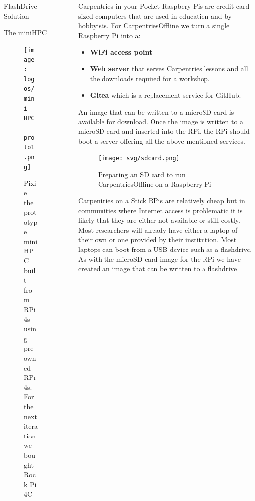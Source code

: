 \documentclass[final,20pt]{beamer}
\newlength{\sepwidth}
\newlength{\colwidth}
\newcommand{\separatorcolumn}{\begin{column}{\sepwidth}\end{column}}
\begin{document}
\begin{frame}[t]
\begin{columns}[t]
\begin{column}{\colwidth}
\begin{block}{FlashDrive Solution}
				\end{block}
				\begin{block}{The miniHPC }	
					\begin{figure}
						\begin{center}
							\texttt{[image: logos/mini-HPC-proto1.png]}
							\caption{Pixie the prototype miniHPC built from RPi4s using pre-owned RPi 4s. 
								For the next iteration we bought Rock Pi 4C+}
						\end{center}
					\end{figure}
				\end{block}
			\end{column}
			\separatorcolumn
			\begin{column}{\colwidth}
				\begin{alertblock}{Carpentries in your Pocket}
					Raspbery Pis are credit card sized computers that are used in education and by hobbyists.
					For CarpentriesOffline we turn a single Raspberry Pi into a:
					\begin{itemize}
					\item \textbf{WiFi access point}.
					\item \textbf{Web server} that serves Carpentries lessons and all the downloads required for 
					a workshop.
					\item \textbf{Gitea} which is a replacement service for GitHub. 
					\end{itemize}
					An image that can be written to a microSD card is available 
					for download. Once the image is written to a microSD card and inserted into the RPi, 
					the RPi should boot a server offering all the above mentioned services.
					\begin{center}
						\begin{figure}
							\texttt{[image: svg/sdcard.png]}
							\caption{Preparing an SD card to run CarpentriesOffline on a Raspberry Pi}
						\end{figure}
					\end{center}
				\end{alertblock}		
				\begin{alertblock}{Carpentries on a Stick}
					RPis are relatively cheap but in communities where Internet access is problematic it is likely that they are either not available or still 
					costly. Most researchers will already have either a laptop of their own or one provided by their institution. Most laptops can boot from 
					a USB device such as a flashdrive. As with the microSD card image for the RPi we have created an image that can be written to a flashdrive 

\end{alertblock}
\end{column}
\end{columns}
\end{frame}
\end{document}
